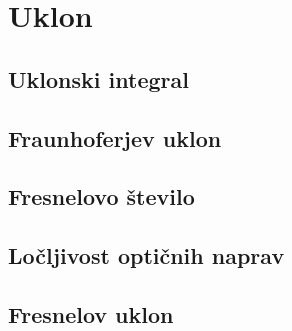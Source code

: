 
\chapter{Uklon}

\section{Uklonski integral}
\section{Fraunhoferjev uklon}
\section{Fresnelovo število}
\section{Ločljivost optičnih naprav}
\section{Fresnelov uklon}
